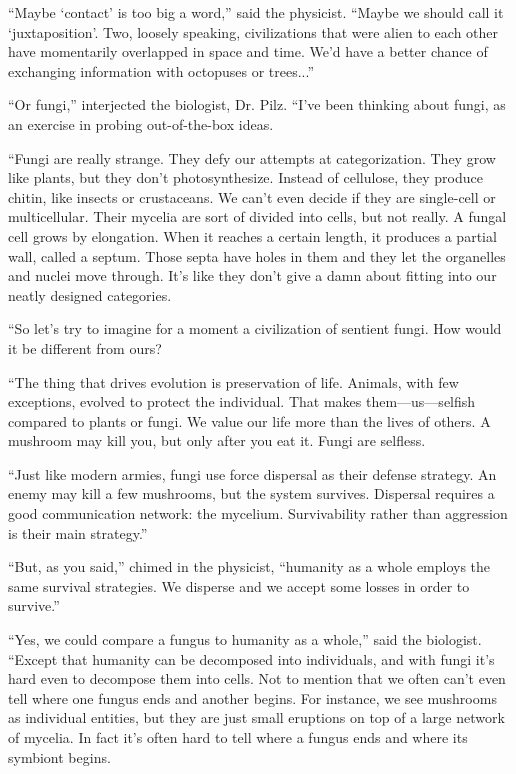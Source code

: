 \documentclass[12pt]{book}
\begin{document}
``Maybe `contact' is too big a word,'' said the physicist. ``Maybe we should call it `juxtaposition'. Two, loosely speaking, civilizations that were alien to each other have momentarily overlapped in space and time. We'd have a better chance of exchanging information with octopuses or trees...''

``Or fungi,'' interjected the biologist, Dr. Pilz. ``I've been thinking about fungi, as an exercise in probing out-of-the-box ideas.

``Fungi are really strange. They defy our attempts at categorization. They grow like plants, but they don't photosynthesize. Instead of cellulose, they produce chitin, like insects or crustaceans. We can't even decide if they are single-cell or multicellular. Their mycelia are sort of divided into cells, but not really. A fungal cell grows by elongation. When it reaches a certain length, it produces a partial wall, called a septum. Those septa have holes in them and they let the organelles and nuclei move through. It's like they don't give a damn about fitting into our neatly designed categories. 

``So let's try to imagine for a moment a civilization of sentient fungi. How would it be different from ours?

``The thing that drives evolution is preservation of life. Animals, with few exceptions, evolved to protect the individual. That makes them---us---selfish compared to plants or fungi. We value our life more than the lives of others. A mushroom may kill you, but only after you eat it. Fungi are selfless. 

``Just like modern armies, fungi use force dispersal as their defense strategy. An enemy may kill a few mushrooms, but the system survives. Dispersal requires a good communication network: the mycelium. Survivability rather than aggression is their main strategy.''

``But, as you said,'' chimed in the physicist, ``humanity as a whole employs the same survival strategies. We disperse and we accept some losses in order to survive.''

``Yes, we could compare a fungus to humanity as a whole,'' said the biologist. ``Except that humanity can be decomposed into individuals, and with fungi it's hard even to decompose them into cells. Not to mention that we often can't even tell where one fungus ends and another begins. For instance, we see mushrooms as individual entities, but they are just small eruptions on top of a large network of mycelia. In fact it's often hard to tell where a fungus ends and where its symbiont begins.
\end{document}
